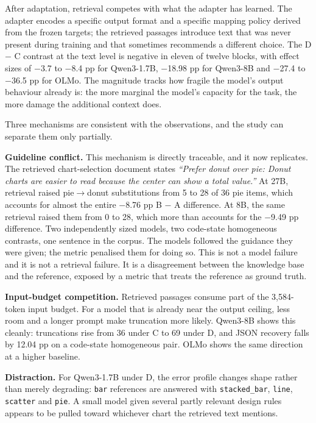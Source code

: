 After adaptation, retrieval competes with what the adapter has learned. The adapter encodes a specific output format and a specific mapping policy derived from the frozen targets; the retrieved passages introduce text that was never present during training and that sometimes recommends a different choice. The D \ensuremath{-} C contrast at the text level is negative in eleven of twelve blocks, with effect sizes of \ensuremath{-}3.7 to \ensuremath{-}8.4 pp for Qwen3-1.7B, \ensuremath{-}18.98 pp for Qwen3-8B and \ensuremath{-}27.4 to \ensuremath{-}36.5 pp for OLMo. The magnitude tracks how fragile the model's output behaviour already is: the more marginal the model's capacity for the task, the more damage the additional context does.

Three mechanisms are consistent with the observations, and the study can separate them only partially.

\textbf{Guideline conflict.} This mechanism is directly traceable, and it now replicates. The retrieved chart-selection document states \emph{``Prefer donut over pie: Donut charts are easier to read because the center can show a total value.''} At 27B, retrieval raised pie\(\rightarrow\)donut substitutions from 5 to 28 of 36 pie items, which accounts for almost the entire \ensuremath{-}8.76 pp B \ensuremath{-} A difference. At 8B, the same retrieval raised them from 0 to 28, which more than accounts for the \ensuremath{-}9.49 pp difference. Two independently sized models, two code-state homogeneous contrasts, one sentence in the corpus. The models followed the guidance they were given; the metric penalised them for doing so. This is not a model failure and it is not a retrieval failure. It is a disagreement between the knowledge base and the reference, exposed by a metric that treats the reference as ground truth.

\textbf{Input-budget competition.} Retrieved passages consume part of the 3,584-token input budget. For a model that is already near the output ceiling, less room and a longer prompt make truncation more likely. Qwen3-8B shows this cleanly: truncations rise from 36 under C to 69 under D, and JSON recovery falls by 12.04 pp on a code-state homogeneous pair. OLMo shows the same direction at a higher baseline.

\textbf{Distraction.} For Qwen3-1.7B under D, the error profile changes shape rather than merely degrading: \texttt{bar} references are answered with \texttt{stacked\_bar}, \texttt{line}, \texttt{scatter} and \texttt{pie}. A small model given several partly relevant design rules appears to be pulled toward whichever chart the retrieved text mentions.

